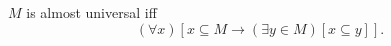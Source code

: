$M$ is almost universal iff
$$(\forall x)[x \subseteq M \rightarrow (\exists y \in M)[x \subseteq y]].$$
